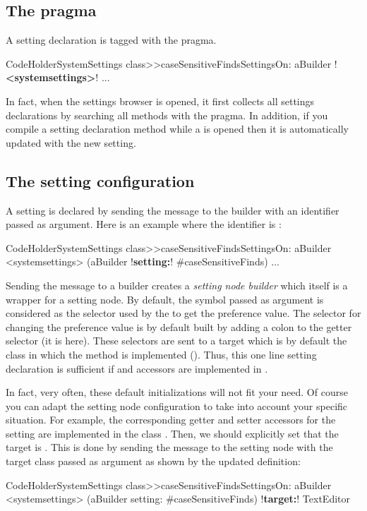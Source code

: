 \documentclass[a4paper,10pt,twoside]{book}
\begin{document}
\subsection{The pragma}
A setting declaration is tagged with the  pragma.
\begin{code}{}
CodeHolderSystemSettings class>>caseSensitiveFindsSettingsOn: aBuilder
	!\textbf{<systemsettings>}!
   ...
\end{code}
In fact, when the settings browser is opened, it first collects all settings declarations by searching all methods with the  pragma. In addition, if you compile a setting declaration method while a \setbrowser is opened then it is automatically updated with the new setting. 

\subsection{The setting configuration}
A setting is declared by sending the message  to the builder with an identifier passed as argument. Here is an example where the identifier is : 
\begin{code}{}
CodeHolderSystemSettings class>>caseSensitiveFindsSettingsOn: aBuilder
	<systemsettings>
	(aBuilder !\textbf{setting:}! #caseSensitiveFinds) 
    ...
\end{code}

Sending the message  to a builder creates a \textit{setting node builder}  which itself is a wrapper for a setting node. By default, the symbol passed as argument is considered as the selector used by the \setbrowser to get the preference value. The selector for changing the preference value is by default built by adding a colon to the getter selector (\ie it is  here).
These selectors are sent to a target which is by default the class in which the method is implemented (\ie {}). Thus, this one line setting declaration is sufficient if   and  accessors are implemented in . 

In fact, very often, these default initializations will not fit your need. Of course you can adapt the setting node configuration to take into account your specific situation. 
For example,  the corresponding getter and setter accessors for the  setting are implemented in the class . Then, we should explicitly set that the target is . This is done by sending the message  to the setting node with the target class  passed as argument as shown by the updated definition: 
\begin{code}{}
CodeHolderSystemSettings class>>caseSensitiveFindsSettingsOn: aBuilder
	<systemsettings>
	(aBuilder setting: #caseSensitiveFinds) 
		 !\textbf{target:}! TextEditor
\end{code}
\end{document}
